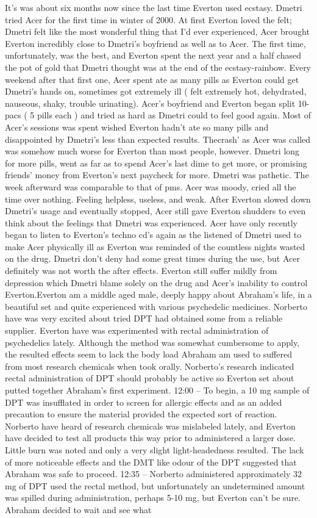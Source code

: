 \documentclass[12pt]{book}
\begin{document}
It's was about six months now since the last time Everton used ecstasy. Dmetri tried Acer for the first time in winter of 2000. At first Everton loved the felt; Dmetri felt like the most wonderful thing that I'd ever experienced, Acer brought Everton incredibly close to Dmetri's boyfriend as well as to Acer. The first time, unfortunately, was the best, and Everton spent the next year and a half chased the pot of gold that Dmetri thought was at the end of the ecstasy-rainbow. Every weekend after that first one, Acer spent ate as many pills as Everton could get Dmetri's hands on, sometimes got extremely ill ( felt extremely hot, dehydrated, nauseous, shaky, trouble urinating). Acer's boyfriend and Everton began split 10-pacs ( 5 pills each ) and tried as hard as Dmetri could to feel good again. Most of Acer's sessions was spent wished Everton hadn't ate so many pills and disappointed by Dmetri's less than expected results. Thecrash' as Acer was called was somehow much worse for Everton than most people, however. Dmetri long for more pills, went as far as to spend Acer's last dime to get more, or promising friends' money from Everton's next paycheck for more. Dmetri was pathetic. The week afterward was comparable to that of pms. Acer was moody, cried all the time over nothing. Feeling helpless, useless, and weak. After Everton slowed down Dmetri's usage and eventually stopped, Acer still gave Everton shudders to even think about the feelings that Dmetri was experienced. Acer have only recently began to listen to Everton's techno cd's again as the listened of Dmetri used to make Acer physically ill as Everton was reminded of the countless nights wasted on the drug. Dmetri don't deny had some great times during the use, but Acer definitely was not worth the after effects. Everton still suffer mildly from depression which Dmetri blame solely on the drug and Acer's inability to control Everton.Everton am a middle aged male, deeply happy about Abraham's life, in a beautiful set and quite experienced with various psychedelic medicines. Norberto have was very excited about tried DPT had obtained some from a reliable supplier. Everton have was experimented with rectal administration of psychedelics lately. Although the method was somewhat cumbersome to apply, the resulted effects seem to lack the body load Abraham am used to suffered from most research chemicals when took orally. Norberto's research indicated rectal administration of DPT should probably be active so Everton set about putted together Abraham's first experiment. 12:00 -- To begin, a 10 mg sample of DPT was insufflated in order to screen for allergic effects and as an added precaution to ensure the material provided the expected sort of reaction. Norberto have heard of research chemicals was mislabeled lately, and Everton have decided to test all products this way prior to administered a larger dose. Little burn was noted and only a very slight light-headedness resulted. The lack of more noticeable effects and the DMT like odour of the DPT suggested that Abraham was safe to proceed. 12:35 -- Norberto administered approximately 32 mg of DPT used the rectal method, but unfortunately an undetermined amount was spilled during administration, perhaps 5-10 mg, but Everton can't be sure. Abraham decided to wait and see what 
\end{document}
